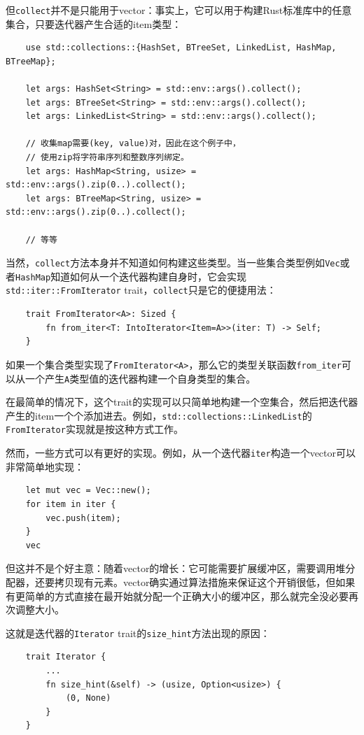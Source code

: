 但\texttt{collect}并不是只能用于vector：事实上，它可以用于构建Rust标准库中的任意集合，只要迭代器产生合适的item类型：
\begin{verbatim}
    use std::collections::{HashSet, BTreeSet, LinkedList, HashMap, BTreeMap};

    let args: HashSet<String> = std::env::args().collect();
    let args: BTreeSet<String> = std::env::args().collect();
    let args: LinkedList<String> = std::env::args().collect();

    // 收集map需要(key, value)对，因此在这个例子中，
    // 使用zip将字符串序列和整数序列绑定。
    let args: HashMap<String, usize> = std::env::args().zip(0..).collect();
    let args: BTreeMap<String, usize> = std::env::args().zip(0..).collect();

    // 等等
\end{verbatim}

当然，\texttt{collect}方法本身并不知道如何构建这些类型。当一些集合类型例如\texttt{Vec}或者\texttt{HashMap}知道如何从一个迭代器构建自身时，它会实现\texttt{std::iter::FromIterator} trait，\texttt{collect}只是它的便捷用法：
\begin{verbatim}
    trait FromIterator<A>: Sized {
        fn from_iter<T: IntoIterator<Item=A>>(iter: T) -> Self;
    }
\end{verbatim}
如果一个集合类型实现了\texttt{FromIterator<A>}，那么它的类型关联函数\texttt{from\_iter}可以从一个产生\texttt{A}类型值的迭代器构建一个自身类型的集合。

在最简单的情况下，这个trait的实现可以只简单地构建一个空集合，然后把迭代器产生的item一个个添加进去。例如，\texttt{std::collections::LinkedList}的\texttt{FromIterator}实现就是按这种方式工作。

然而，一些方式可以有更好的实现。例如，从一个迭代器\texttt{iter}构造一个vector可以非常简单地实现：
\begin{verbatim}
    let mut vec = Vec::new();
    for item in iter {
        vec.push(item);
    }
    vec
\end{verbatim}

但这并不是个好主意：随着vector的增长：它可能需要扩展缓冲区，需要调用堆分配器，还要拷贝现有元素。vector确实通过算法措施来保证这个开销很低，但如果有更简单的方式直接在最开始就分配一个正确大小的缓冲区，那么就完全没必要再次调整大小。

这就是迭代器的\texttt{Iterator} trait的\texttt{size\_hint}方法出现的原因：
\begin{verbatim}
    trait Iterator {
        ...
        fn size_hint(&self) -> (usize, Option<usize>) {
            (0, None)
        }
    }
\end{verbatim}


